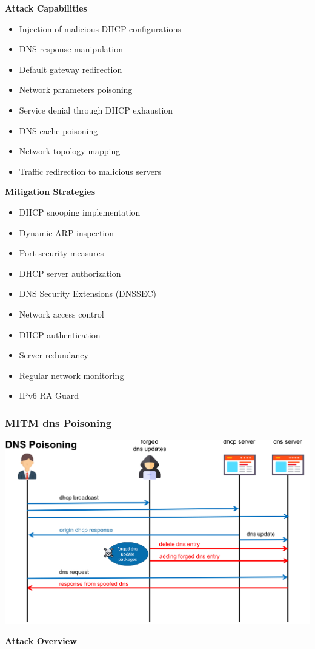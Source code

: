 \textbf{Attack Capabilities}
\begin{itemize}
    \item Injection of malicious DHCP configurations
    \item DNS response manipulation
    \item Default gateway redirection
    \item Network parameters poisoning
    \item Service denial through DHCP exhaustion
    \item DNS cache poisoning
    \item Network topology mapping
    \item Traffic redirection to malicious servers
\end{itemize}

\textbf{Mitigation Strategies}
\begin{itemize}
    \item DHCP snooping implementation
    \item Dynamic ARP inspection
    \item Port security measures
    \item DHCP server authorization
    \item DNS Security Extensions (DNSSEC)
    \item Network access control
    \item DHCP authentication
    \item Server redundancy
    \item Regular network monitoring
    \item IPv6 RA Guard
\end{itemize}

\subsubsection{MITM dns Poisoning}
\begin{center}
\includegraphics[width=\textwidth]{resources/07-dns-poisoning.png}
\end{center}
\textbf{Attack Overview}


